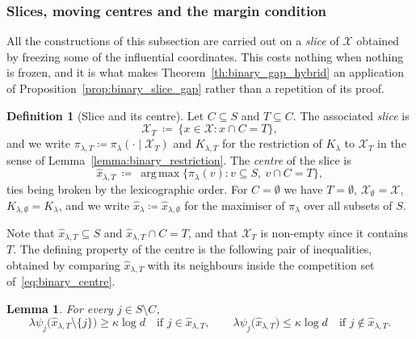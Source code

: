\documentclass[aos]{imsart}%
\newcommand{\ambientspace}[0]{\mathcal{X}}
\theoremstyle{plain}
\newtheorem{lemma}[theorem]{Lemma}
\theoremstyle{definition}
\newtheorem{definition}[theorem]{Definition}
\begin{document}
    \subsubsection{Slices, moving centres and the margin condition}

    All the constructions of this subsection are carried out on a
    \emph{slice} of $\ambientspace$ obtained by freezing some of the
    influential coordinates. This costs nothing when nothing is frozen, and it
    is what makes Theorem~\ref{th:binary_gap_hybrid} an application of
    Proposition~\ref{prop:binary_slice_gap} rather than a repetition of its
    proof.

    \begin{definition}[Slice and its centre]
        \label{def:binary_slice}
        Let $C\subseteq S$ and $T\subseteq C$. The associated \emph{slice} is
        \begin{equation}
            \label{eq:binary_slice}
            \ambientspace_T\ \coloneq\ \{x\in\ambientspace:x\cap C=T\},
        \end{equation}
        and we write $\pi_{\lambda,T}\coloneq
        \pi_\lambda(\cdot\mid\ambientspace_T)$ and $K_{\lambda,T}$ for the
        restriction of $K_\lambda$ to $\ambientspace_T$ in the sense of
        Lemma~\ref{lemma:binary_restriction}. The \emph{centre} of the slice
        is
        \begin{equation}
            \label{eq:binary_centre}
            \hat x_{\lambda,T}\ \coloneq\ \operatorname*{arg\,max}
            \bigl\{\pi_\lambda(v):v\subseteq S,\ v\cap C=T\bigr\},
        \end{equation}
        ties being broken by the lexicographic order. For $C=\emptyset$ we have
        $T=\emptyset$, $\ambientspace_\emptyset=\ambientspace$,
        $K_{\lambda,\emptyset}=K_\lambda$, and we write
        $\hat x_\lambda\coloneq\hat x_{\lambda,\emptyset}$ for the maximiser of
        $\pi_\lambda$ over all subsets of $S$.
    \end{definition}

    Note that $\hat x_{\lambda,T}\subseteq S$ and
    $\hat x_{\lambda,T}\cap C=T$, and that $\ambientspace_T$ is non-empty since
    it contains $T$. The defining property of the centre is the following pair
    of inequalities, obtained by comparing $\hat x_{\lambda,T}$ with its
    neighbours inside the competition set of~\eqref{eq:binary_centre}.

    \begin{lemma}
        \label{lemma:binary_modeon}
        For every $j\in S\setminus C$,
        \begin{equation}
            \label{eq:binary_modeon}
            \lambda\psi_j\bigl(\hat x_{\lambda,T}\setminus\{j\}\bigr)
            \geq\kappa\log d\quad\text{if }j\in\hat x_{\lambda,T},
            \qquad
            \lambda\psi_j\bigl(\hat x_{\lambda,T}\bigr)\leq\kappa\log d
            \quad\text{if }j\notin\hat x_{\lambda,T}.
        \end{equation}
    \end{lemma}
\end{document}
